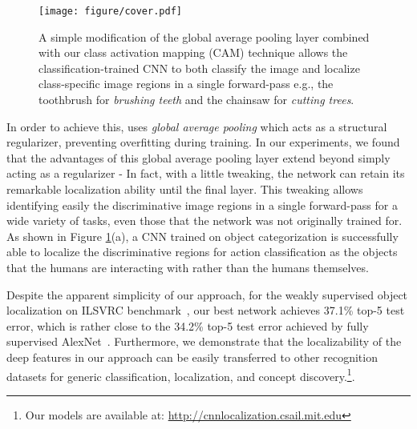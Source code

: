 \documentclass[10pt,twocolumn,letterpaper]{article}
\begin{document}
\begin{figure}
\begin{center}
\texttt{[image: figure/cover.pdf]}
\end{center}
\vspace*{-4mm}
\caption{A simple modification of the global average pooling layer combined with our class activation mapping (CAM) technique allows the classification-trained CNN to both classify the image and localize class-specific image regions in a single forward-pass e.g., the toothbrush for \textit{brushing teeth} and the chainsaw for \textit{cutting trees}.}\label{figure_cover}
\end{figure}

In order to achieve this, \cite{lin2013network} uses \textit{global average pooling} which acts as a structural regularizer, preventing overfitting during training. In our experiments, we found that the advantages of this global average pooling layer extend beyond simply acting as a regularizer - In fact, with a little tweaking, the network can retain its remarkable localization ability until the final layer. This tweaking allows identifying easily the discriminative image regions in a single forward-pass for a wide variety of tasks, even those that the network was not originally trained for. As shown in Figure \ref{figure_cover}(a), a CNN trained on object categorization is successfully able to localize the discriminative regions for action classification as the objects that the humans are interacting with rather than the humans themselves. 


Despite the apparent simplicity of our approach, for the weakly supervised object localization on ILSVRC benchmark~\cite{ILSVRCijcv15}, our best network achieves 37.1\% top-5 test error, which is rather close to the 34.2\% top-5 test error achieved by fully supervised AlexNet~\cite{krizhevsky2012imagenet}. Furthermore, we demonstrate that the localizability of the deep features in our approach can be easily transferred to other recognition datasets for generic classification, localization, and concept discovery.\footnote{Our models are available at: \href{http://cnnlocalization.csail.mit.edu}{http://cnnlocalization.csail.mit.edu}}.
\end{document}
